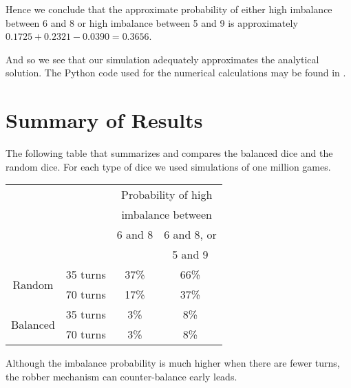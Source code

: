 \documentclass[11pt]{article}
\begin{document}
Hence we conclude that the approximate probability of either high imbalance between 6 and 8 or high imbalance between 5 and 9 is approximately $0.1725 + 0.2321 - 0.0390 = 0.3656$.

And so we see that our simulation adequately approximates the analytical solution. The Python code used for the numerical calculations may be found in \cite{githubsim}.

\section{Summary of Results}
The following table that summarizes and compares the balanced dice and the random dice. For each type of dice we used simulations of one million games.

\begin{center}
\vspace{1cm}

	\begin{tabular}{cc|c|c|}
\cline{3-4}
&& \multicolumn{2}{|c|}{Probability of high} \\
&& \multicolumn{2}{|c|}{imbalance between} \\
\cline{3-4}
&& 6 and 8 & 6 and 8, or \\
&& & 5 and 9 \\
\hline
\multicolumn{1}{|c}{\multirow{2}{*}{Random}} & 
\multicolumn{1}{|c|}{35 turns} & 37\% & 66\% \\
\cline{2-4}
\multicolumn{1}{|c}{\multirow{2}{*}{}} 
& \multicolumn{1}{|c|}{70 turns} & 17\% & 37\% \\
\hline
\multicolumn{1}{|c}{\multirow{2}{*}{Balanced}} & 
\multicolumn{1}{|c|}{35 turns} & 3\% & 8\% \\
\cline{2-4} 
\multicolumn{1}{|c}{\multirow{2}{*}{}} 
& \multicolumn{1}{|c|}{70 turns} & 3\% & 8\% \\
\hline
\end{tabular}
\end{center}
Although the imbalance probability is much higher when there are fewer turns, the robber mechanism can counter-balance early leads.
\end{document}
